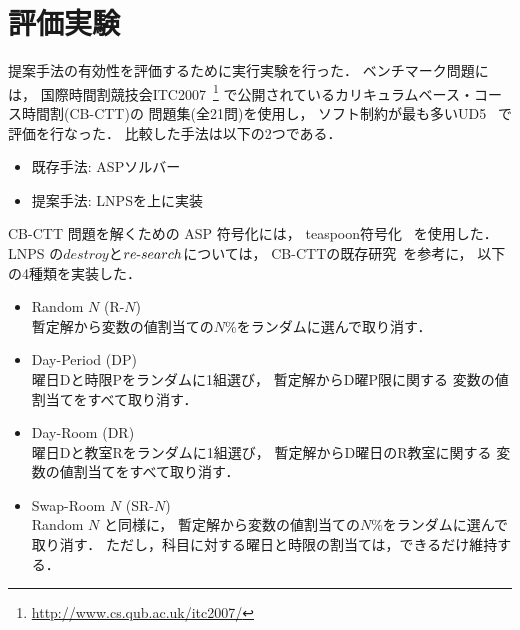 \section{評価実験}


提案手法の有効性を評価するために実行実験を行った．
ベンチマーク問題には，
国際時間割競技会ITC2007~\footnote{%
  \url{http://www.cs.qub.ac.uk/itc2007/}}
で公開されているカリキュラムベース・コース時間割(CB-CTT)の
問題集(全21問)を使用し，
ソフト制約が最も多いUD5~\cite{DBLP:journals/anor/BonuttiCGS12}
で評価を行なった．
%
比較した手法は以下の2つである．
\begin{itemize}\compress
\item 既存手法: ASPソルバー{\clingo}
\item 提案手法: LNPSを{\clingo}上に実装
\end{itemize}

CB-CTT 問題を解くための ASP 符号化には，
\textsf{teaspoon}符号化~\cite{anor/Banbara2019}
を使用した．
LNPS の$destroy$と$re\mathchar`-search$については，
CB-CTTの既存研究~\cite{anor/Kiefer2017}を参考に，
以下の4種類を実装した．
\begin{itemize}\compress
\item \textsf{Random} $N$ (\textsf{R-$N$})\\
  暫定解から変数の値割当ての$N$\%をランダムに選んで取り消す．
\item \textsf{Day-Period} (\textsf{DP})\\
  曜日\textsf{D}と時限\textsf{P}をランダムに1組選び，
  暫定解から\textsf{D}曜\textsf{P}限に関する
  変数の値割当てをすべて取り消す．
\item \textsf{Day-Room} (\textsf{DR})\\
  曜日\textsf{D}と教室\textsf{R}をランダムに1組選び，
  暫定解から\textsf{D}曜日の\textsf{R}教室に関する
  変数の値割当てをすべて取り消す．
\item \textsf{Swap-Room} $N$ (\textsf{SR-$N$})\\
  \textsf{Random} $N$ と同様に，
  暫定解から変数の値割当ての$N$\%をランダムに選んで取り消す．
  ただし，科目に対する曜日と時限の割当ては，できるだけ維持する．
\end{itemize}

